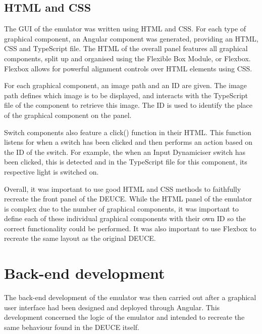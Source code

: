 \documentclass{l4proj}
\begin{document}
\subsection{HTML and CSS}
The GUI of the emulator was written using HTML and CSS. For each type of graphical component, an Angular component was generated, providing an HTML, CSS and TypeScript file. The HTML of the overall panel features all graphical components, split up and organised using the Flexible Box Module, or Flexbox. Flexbox allows for powerful alignment controls over HTML elements using CSS. 

For each graphical component, an image path and an ID are given. The image path defines which image is to be displayed, and interacts with the TypeScript file of the component to retrieve this image. The ID is used to identify the place of the graphical component on the panel.

Switch components also feature a click() function in their HTML. This function listens for when a switch has been clicked and then performs an action based on the ID of the switch. For example, the when an Input Dynamiciser switch has been clicked, this is detected and in the TypeScript file for this component, its respective light is switched on.

Overall, it was important to use good HTML and CSS methods to faithfully recreate the front panel of the DEUCE. While the HTML panel of the emulator is complex due to the number of graphical components, it was important to define each of these individual graphical components with their own ID so the correct functionality could be performed. It was also important to use Flexbox to recreate the same layout as the original DEUCE.

\section{Back-end development}
The back-end development of the emulator was then carried out after a graphical user interface had been designed and deployed through Angular. This development concerned the logic of the emulator and intended to recreate the same behaviour found in the DEUCE itself.
\end{document}
